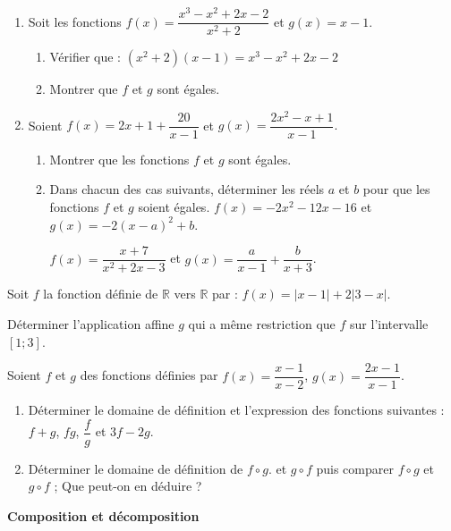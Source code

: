 \documentclass[12pt]{article}
\begin{document}
\begin{enumerate}
    \item  Soit les fonctions \( f(x) = \dfrac{x^3 - x^2 + 2x - 2}{x^2 + 2} \) et \( g(x) = x - 1 \).

\begin{enumerate}
    \item Vérifier que :
\( (x^2 + 2)(x - 1) = x^3 - x^2 + 2x - 2 \)
    \item Montrer que \( f \) et \( g \) sont égales.
\end{enumerate}

\item Soient \( f(x) = 2x + 1 + \dfrac{20}{x - 1} \) et
\( g(x) = \dfrac{2x^2 - x + 1}{x - 1}. \)

\begin{enumerate}
\item Montrer que les fonctions \( f \) et \( g \) sont égales.
\item Dans chacun des cas suivants, déterminer les réels \( a \) et \( b \) pour que les fonctions \( f \) et \( g \) soient égales.
\( f(x) = -2x^2 - 12x - 16 \) et \( g(x) = -2(x - a)^2 + b \).

\( f(x) = \dfrac{x + 7}{x^2 + 2x - 3} \) et \( g(x) = \dfrac{a}{x - 1} + \dfrac{b}{x + 3} \).
\end{enumerate}
\end{enumerate}

 \quad Soit \( f \) la fonction définie de \( \mathbb{R} \) vers \( \mathbb{R} \) par :  
\( f(x) = |x - 1| + 2 |3 - x| \).  

Déterminer l’application affine \( g \) qui a même restriction que \( f \) sur l’intervalle \([1;3]\).

\bigskip

 \quad Soient \( f \) et \( g \) des fonctions définies par  
\( f(x) = \dfrac{x - 1}{x - 2} \), \( g(x) = \dfrac{2x - 1}{x - 1} \).

\begin{enumerate}
    \item Déterminer le domaine de définition et l’expression des fonctions suivantes : \( f + g \), \( fg \), \( \dfrac{f}{g} \) et \( 3f - 2g \).
    \item Déterminer le domaine de définition de \( f \circ g \). et \( g \circ f \) puis comparer \( f \circ g \) et \( g \circ f \) ; Que peut-on en déduire ?
\end{enumerate}

 \quad \textbf{Composition et décomposition}
\end{document}
